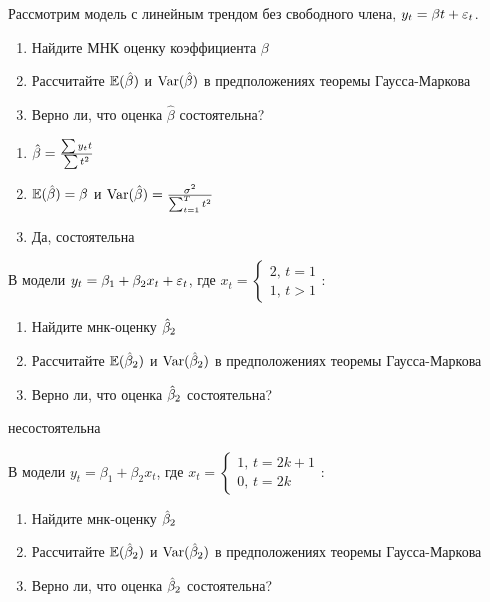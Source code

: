 \documentclass[pdftex,11pt,openany]{book}\usepackage[]{graphicx}\usepackage[]{color}
\begin{document}
\begin{problem}
 Рассмотрим модель с линейным трендом без свободного члена, $y_t=\beta t +\varepsilon_t$. 
\begin{enumerate}
\item Найдите МНК оценку коэффициента $\beta$
\item Рассчитайте $\mathbb{E}(\hat{\beta})$ и $\operatorname{Var}(\hat{\beta})$ в предположениях теоремы Гаусса-Маркова
\item Верно ли, что оценка $\hat{\beta}$ состоятельна?
\end{enumerate}
\end{problem}
 

\begin{solution}
\begin{enumerate}
\item $\hat{\beta}=\frac{\sum y_t t}{\sum t^2}$
\item $\mathbb{E}(\hat{\beta})=\beta$ и $\operatorname{Var}(\hat{\beta})=\frac{\sigma^2}{\sum_{t=1}^{T} t^2}$
\item Да, состоятельна
\end{enumerate}
\end{solution}


\begin{problem}
 В модели $y_t=\beta_1+\beta_2 x_t+\varepsilon_t$, где 
$x_t=\left\{
\begin{array}{l}
2,\, t=1 \\
1,\, t>1
\end{array}
\right.
$:
\begin{enumerate}
\item Найдите мнк-оценку $\hat{\beta}_2$
\item Рассчитайте $\mathbb{E}(\hat{\beta}_2)$ и $\operatorname{Var}(\hat{\beta}_2)$ в предположениях теоремы Гаусса-Маркова
\item Верно ли, что оценка $\hat{\beta}_2$ состоятельна?
\end{enumerate}
\end{problem}

\begin{solution}
несостоятельна
\end{solution}


\begin{problem}
 В модели $y_t=\beta_1+\beta_2 x_t$, где 
$x_t=\left\{
\begin{array}{l}
1,\, t=2k+1 \\
0,\, t=2k
\end{array}
\right.
$:
\begin{enumerate}
\item Найдите мнк-оценку $\hat{\beta}_2$
\item Рассчитайте $\mathbb{E}(\hat{\beta}_2)$ и $\operatorname{Var}(\hat{\beta}_2)$ в предположениях теоремы Гаусса-Маркова
\item Верно ли, что оценка $\hat{\beta}_2$ состоятельна?
\end{enumerate}
\end{problem}
\end{document}

